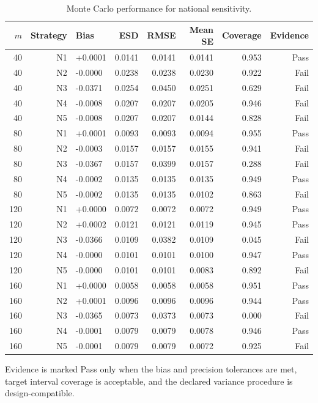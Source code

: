 \begin{table}[h!]
\centering
\small
\caption{Monte Carlo performance for national sensitivity.}
\label{tab:nav-national-performance}
\begin{tabular}{rrlrrrrr}
\toprule
$m$ & Strategy & Bias & ESD & RMSE & Mean SE & Coverage & Evidence \\
\midrule
40 & N1 & +0.0001 & 0.0141 & 0.0141 & 0.0141 & 0.953 & Pass \\
40 & N2 & -0.0000 & 0.0238 & 0.0238 & 0.0230 & 0.922 & Fail \\
40 & N3 & -0.0371 & 0.0254 & 0.0450 & 0.0251 & 0.629 & Fail \\
40 & N4 & -0.0008 & 0.0207 & 0.0207 & 0.0205 & 0.946 & Fail \\
40 & N5 & -0.0008 & 0.0207 & 0.0207 & 0.0144 & 0.828 & Fail \\
80 & N1 & +0.0001 & 0.0093 & 0.0093 & 0.0094 & 0.955 & Pass \\
80 & N2 & -0.0003 & 0.0157 & 0.0157 & 0.0155 & 0.941 & Fail \\
80 & N3 & -0.0367 & 0.0157 & 0.0399 & 0.0157 & 0.288 & Fail \\
80 & N4 & -0.0002 & 0.0135 & 0.0135 & 0.0135 & 0.949 & Pass \\
80 & N5 & -0.0002 & 0.0135 & 0.0135 & 0.0102 & 0.863 & Fail \\
120 & N1 & +0.0000 & 0.0072 & 0.0072 & 0.0072 & 0.949 & Pass \\
120 & N2 & +0.0002 & 0.0121 & 0.0121 & 0.0119 & 0.945 & Pass \\
120 & N3 & -0.0366 & 0.0109 & 0.0382 & 0.0109 & 0.045 & Fail \\
120 & N4 & -0.0000 & 0.0101 & 0.0101 & 0.0100 & 0.947 & Pass \\
120 & N5 & -0.0000 & 0.0101 & 0.0101 & 0.0083 & 0.892 & Fail \\
160 & N1 & +0.0000 & 0.0058 & 0.0058 & 0.0058 & 0.951 & Pass \\
160 & N2 & +0.0001 & 0.0096 & 0.0096 & 0.0096 & 0.944 & Pass \\
160 & N3 & -0.0365 & 0.0073 & 0.0373 & 0.0073 & 0.000 & Fail \\
160 & N4 & -0.0001 & 0.0079 & 0.0079 & 0.0078 & 0.946 & Pass \\
160 & N5 & -0.0001 & 0.0079 & 0.0079 & 0.0072 & 0.925 & Fail \\
\bottomrule
\end{tabular}
\par\vspace{2pt}
\begin{minipage}{0.97\linewidth}\footnotesize Evidence is marked Pass only when the bias and precision tolerances are met, target interval coverage is acceptable, and the declared variance procedure is design-compatible.\end{minipage}
\end{table}

